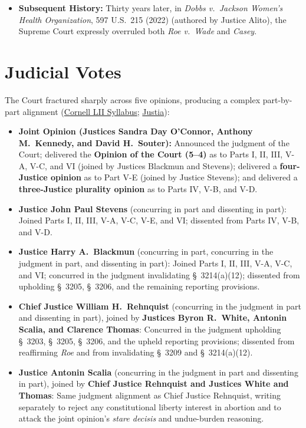 \documentclass[12pt]{article}
\begin{document}
\begin{itemize}
\item \textbf{Subsequent History:} Thirty years later, in \textit{Dobbs v.\ Jackson Women's Health Organization}, 597 U.S.\ 215 (2022) (authored by Justice Alito), the Supreme Court expressly overruled both \textit{Roe v.\ Wade} and \textit{Casey}.
\end{itemize}

\section{Judicial Votes}

The Court fractured sharply across five opinions, producing a complex part-by-part alignment (\href{https://www.law.cornell.edu/supct/html/91-744.ZS.html}{Cornell LII Syllabus}; \href{https://supreme.justia.com/cases/federal/us/505/833/}{Justia}):
\begin{itemize}
\item \textbf{Joint Opinion (Justices Sandra Day O'Connor, Anthony M.\ Kennedy, and David H.\ Souter):} Announced the judgment of the Court; delivered the \textbf{Opinion of the Court (5--4)} as to Parts I, II, III, V-A, V-C, and VI (joined by Justices Blackmun and Stevens); delivered a \textbf{four-Justice opinion} as to Part V-E (joined by Justice Stevens); and delivered a \textbf{three-Justice plurality opinion} as to Parts IV, V-B, and V-D.
\item \textbf{Justice John Paul Stevens} (concurring in part and dissenting in part): Joined Parts I, II, III, V-A, V-C, V-E, and VI; dissented from Parts IV, V-B, and V-D.
\item \textbf{Justice Harry A.\ Blackmun} (concurring in part, concurring in the judgment in part, and dissenting in part): Joined Parts I, II, III, V-A, V-C, and VI; concurred in the judgment invalidating \S\ 3214(a)(12); dissented from upholding \S\ 3205, \S\ 3206, and the remaining reporting provisions.
\item \textbf{Chief Justice William H.\ Rehnquist} (concurring in the judgment in part and dissenting in part), joined by \textbf{Justices Byron R.\ White, Antonin Scalia, and Clarence Thomas}: Concurred in the judgment upholding \S\ 3203, \S\ 3205, \S\ 3206, and the upheld reporting provisions; dissented from reaffirming \textit{Roe} and from invalidating \S\ 3209 and \S\ 3214(a)(12).
\item \textbf{Justice Antonin Scalia} (concurring in the judgment in part and dissenting in part), joined by \textbf{Chief Justice Rehnquist and Justices White and Thomas}: Same judgment alignment as Chief Justice Rehnquist, writing separately to reject any constitutional liberty interest in abortion and to attack the joint opinion's \textit{stare decisis} and undue-burden reasoning.
\end{itemize}
\end{document}
